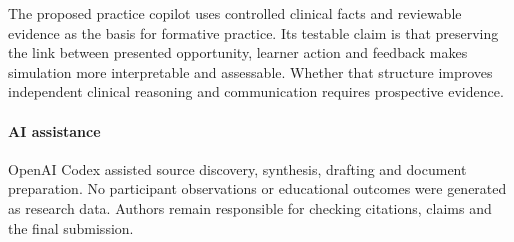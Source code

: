 \documentclass[pmlr,twocolumn,10pt]{jmlr}
\begin{document}
The proposed practice copilot uses controlled clinical facts and reviewable evidence as the basis for formative practice. Its testable claim is that preserving the link between presented opportunity, learner action and feedback makes simulation more interpretable and assessable. Whether that structure improves independent clinical reasoning and communication requires prospective evidence.

\paragraph*{AI assistance}
OpenAI Codex assisted source discovery, synthesis, drafting and document preparation. No participant observations or educational outcomes were generated as research data. Authors remain responsible for checking citations, claims and the final submission.

\end{document}
